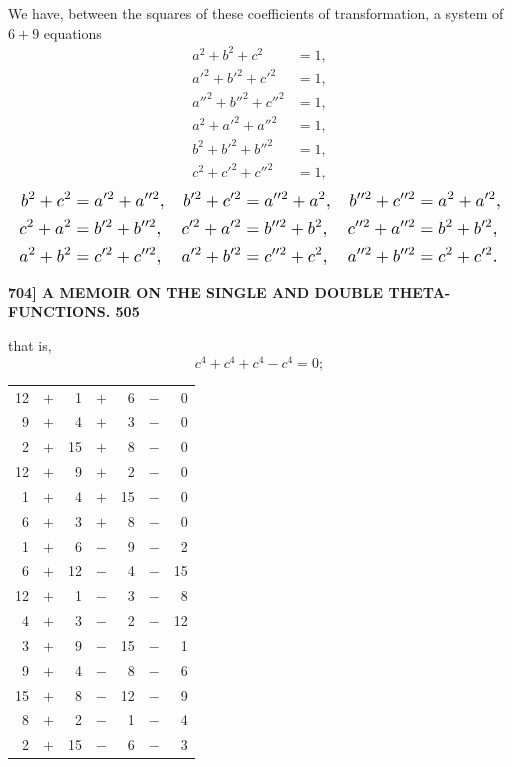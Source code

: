 \documentclass[11pt]{article}
\begin{document}
\medskip
We have, between the squares of these coefficients of transformation, a system of $6+9$ equations
\[
\begin{aligned}
a^2 + b^2 + c^2 &= 1,\\
a'^2 + b'^2 + c'^2 &= 1,\\
a''^2 + b''^2 + c''^2 &= 1,\\
a^2 + a'^2 + a''^2 &= 1,\\
b^2 + b'^2 + b''^2 &= 1,\\
c^2 + c'^2 + c''^2 &= 1,
\end{aligned}
\]
\[
\resizebox{\textwidth}{!}{$\displaystyle
\begin{aligned}
b^2 + c^2 &= a'^2 + a''^2, & b'^2 + c'^2 &= a''^2 + a^2, & b''^2 + c''^2 &= a^2 + a'^2,\\
c^2 + a^2 &= b'^2 + b''^2, & c'^2 + a'^2 &= b''^2 + b^2, & c''^2 + a''^2 &= b^2 + b'^2,\\
a^2 + b^2 &= c'^2 + c''^2, & a'^2 + b'^2 &= c''^2 + c^2, & a''^2 + b''^2 &= c^2 + c'^2.
\end{aligned}$}
\]

\bigskip
\noindent\textbf{704] \hfill A MEMOIR ON THE SINGLE AND DOUBLE THETA-FUNCTIONS. \hfill 505}

\medskip
that is,
\[
c^4 + c^4 + c^4 - c^4 = 0;
\]
\begin{center}
\begin{tabular}{rcrcrcr}
12 & $+$ & 1  & $+$ & 6  & $-$ & 0\\
9  & $+$ & 4  & $+$ & 3  & $-$ & 0\\
2  & $+$ & 15 & $+$ & 8  & $-$ & 0\\[4pt]
12 & $+$ & 9  & $+$ & 2  & $-$ & 0\\
1  & $+$ & 4  & $+$ & 15 & $-$ & 0\\
6  & $+$ & 3  & $+$ & 8  & $-$ & 0\\[4pt]
1  & $+$ & 6  & $-$ & 9  & $-$ & 2\\
6  & $+$ & 12 & $-$ & 4  & $-$ & 15\\
12 & $+$ & 1  & $-$ & 3  & $-$ & 8\\[4pt]
4  & $+$ & 3  & $-$ & 2  & $-$ & 12\\
3  & $+$ & 9  & $-$ & 15 & $-$ & 1\\
9  & $+$ & 4  & $-$ & 8  & $-$ & 6\\[4pt]
15 & $+$ & 8  & $-$ & 12 & $-$ & 9\\
8  & $+$ & 2  & $-$ & 1  & $-$ & 4\\
2  & $+$ & 15 & $-$ & 6  & $-$ & 3\\
\end{tabular}
\end{center}
\end{document}
